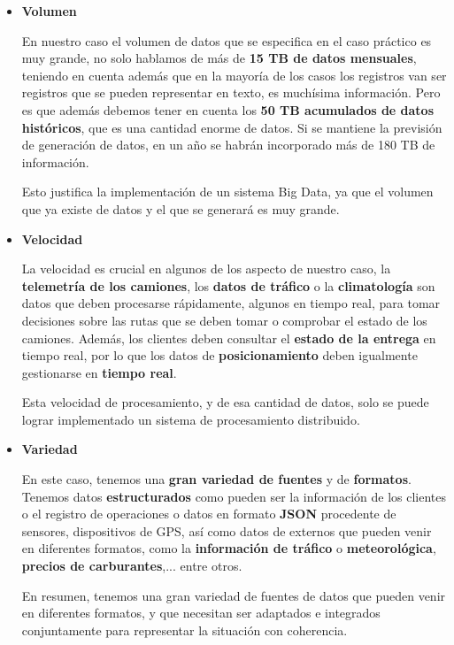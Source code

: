 \begin{itemize}
	\item \textbf{Volumen}
	
	 En nuestro caso el volumen de datos que se especifica en el caso práctico es muy grande, no solo hablamos de más de \textbf{15 TB de datos mensuales}, teniendo en cuenta además que en la mayoría de los casos los registros van ser registros que se pueden representar en texto, es muchísima información. Pero es que además debemos tener en cuenta los \textbf{50 TB acumulados de datos históricos}, que es una cantidad enorme de datos. Si se mantiene la previsión de generación de datos, en un año se habrán incorporado más de 180 TB de información.
	 
	 Esto justifica la implementación de un sistema Big Data, ya que el volumen que ya existe de datos y el que se generará es muy grande.
	
	\item \textbf{Velocidad}
	
	La velocidad es crucial en algunos de los aspecto de nuestro caso, la \textbf{telemetría de los camiones}, los \textbf{datos de tráfico} o la \textbf{climatología} son datos que deben procesarse rápidamente, algunos en tiempo real, para tomar decisiones sobre las rutas que se deben tomar o comprobar el estado de los camiones. Además, los clientes deben consultar el \textbf{estado de la entrega} en tiempo real, por lo que los datos de \textbf{posicionamiento} deben igualmente gestionarse en \textbf{tiempo real}.
	
	Esta velocidad de procesamiento, y de esa cantidad de datos, solo se puede lograr implementado un sistema de procesamiento distribuido.
	
	\item \textbf{Variedad}
	
	En este caso, tenemos una \textbf{gran variedad de fuentes} y de \textbf{formatos}. Tenemos datos \textbf{estructurados} como pueden ser la información de los clientes o el registro de operaciones o datos en formato \textbf{JSON} procedente de sensores, dispositivos de GPS, así como datos de externos que pueden venir en diferentes formatos, como la \textbf{información de tráfico} o \textbf{meteorológica}, \textbf{precios de carburantes},... entre otros. 
	
	En resumen, tenemos una gran variedad de fuentes de datos que pueden venir en diferentes formatos, y que necesitan ser adaptados e integrados conjuntamente para representar la situación con coherencia.
	

\end{itemize}
